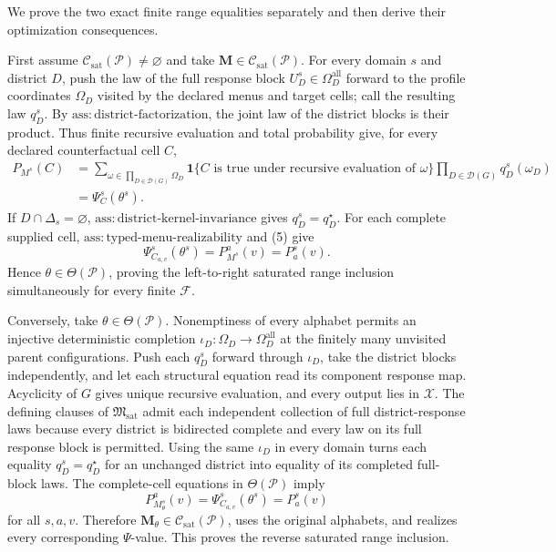 We prove the two exact finite range equalities separately and then derive their optimization consequences.

First assume \(\mathcal C_{\mathrm{sat}}(\mathcal P)\ne\varnothing\) and take \(\mathbf M\in\mathcal C_{\mathrm{sat}}(\mathcal P)\).  For every domain \(s\) and district \(D\), push the law of the full response block \(U_D^s\in\Omega_D^{\mathrm{all}}\) forward to the profile coordinates \(\Omega_D\) visited by the declared menus and target cells; call the resulting law \(q_D^s\).  By \(\mathrm{ass:district\text{-}factorization}\), the joint law of the district blocks is their product.  Thus finite recursive evaluation and total probability give, for every declared counterfactual cell \(C\),
\[
\begin{aligned}
P_{M^s}(C)
&=\sum_{\omega\in\prod_{D\in\mathcal D(G)}\Omega_D}
\mathbf 1\{C\text{ is true under recursive evaluation of }\omega\}
\prod_{D\in\mathcal D(G)}q_D^s(\omega_D)\\
&=\Psi_C^s(\theta^s).
\end{aligned}
\tag{5}
\]
If \(D\cap\Delta_s=\varnothing\), \(\mathrm{ass:district\text{-}kernel\text{-}invariance}\) gives \(q_D^s=q_D^\star\).  For each complete supplied cell, \(\mathrm{ass:typed\text{-}menu\text{-}realizability}\) and (5) give
\[
\Psi_{C_{a,v}}^s(\theta^s)=P_{M^s}^{a}(v)=P_a^s(v).
\]
Hence \(\theta\in\Theta(\mathcal P)\), proving the left-to-right saturated range inclusion simultaneously for every finite \(\mathcal F\).

Conversely, take \(\theta\in\Theta(\mathcal P)\).  Nonemptiness of every alphabet permits an injective deterministic completion \(\iota_D:\Omega_D\to\Omega_D^{\mathrm{all}}\) at the finitely many unvisited parent configurations.  Push each \(q_D^s\) forward through \(\iota_D\), take the district blocks independently, and let each structural equation read its component response map.  Acyclicity of \(G\) gives unique recursive evaluation, and every output lies in \(\mathcal X\).  The defining clauses of \(\mathfrak M_{\mathrm{sat}}\) admit each independent collection of full district-response laws because every district is bidirected complete and every law on its full response block is permitted.  Using the same \(\iota_D\) in every domain turns each equality \(q_D^s=q_D^\star\) for an unchanged district into equality of its completed full-block laws.  The complete-cell equations in \(\Theta(\mathcal P)\) imply
\[
P_{M_\theta^s}^{a}(v)
=\Psi_{C_{a,v}}^s(\theta^s)
=P_a^s(v)
\]
for all \(s,a,v\).  Therefore \(\mathbf M_\theta\in\mathcal C_{\mathrm{sat}}(\mathcal P)\), uses the original alphabets, and realizes every corresponding \(\Psi\)-value.  This proves the reverse saturated range inclusion.


